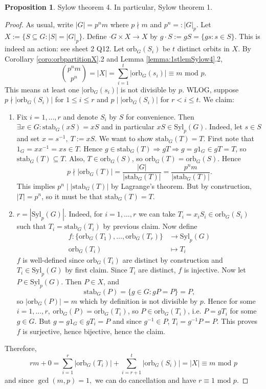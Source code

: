 \documentclass[a4paper]{article}
\newcommand{\Syl}{\text{Syl}}
\newcommand{\orb}{\text{orb}}
\newcommand{\stab}{\text{stab}}
\newcommand{\Mod}{\text{ mod }}
\theoremstyle{definition}
\newtheorem{prop}[defn]{Proposition}
\begin{document}
\begin{prop}
Sylow theorem 4. In particular, Sylow theorem 1.
\end{prop}
\begin{proof}
As usual, write $|G|=p^n m$ where $p\nmid m$ and $p^n=:|G|_p$. Let $X:=\{S\subseteq G:|S|=|G|_p\}$. Define $\cdot G\times X\rightarrow X$ by $g\cdot S:=gS=\{gs:s\in S\}$. This is indeed an action: see sheet 2 Q12. Let $\orb_G(S_i)$ be $t$ distinct orbits in $X$. By Corollary \ref{coro:orbpartitionX}.2 and Lemma \ref{lemma:1stlemSylow4}.2,
\[
\binom{p^n m}{p^n}=|X|=\sum_{i=1}^t |\orb_G(s_i)| \equiv m\Mod p.
\]
This means at least one $|\orb_G(s_i)|$ is not divisible by $p$. WLOG, suppose $p\nmid |\orb_G(S_i)|$ for $1\leq i\leq r$ and $p\mid |\orb_G(S_i)|$ for $r< i\leq t$. We claim:
\begin{enumerate}
\item Fix $i=1,\ldots,r$ and denote $S_i$ by $S$ for convenience. Then $\exists x\in G:\stab_G(xS)=xS$ and in particular $xS\in\Syl_p(G)$. Indeed, let $s\in S$ and set $x=s^{-1},\ T:=xS$. We want to show $\stab_G(T)=T$. First note that $1_G=xx^{-1}=xs\in T$. Hence $g\in\stab_G(T)\Rightarrow gT\Rightarrow g=g1_G\in gT=T$, so $\stab_G(T)\subseteq T$. Also, $T\in\orb_G(S)$, so $\orb_G(T)=\orb_G(S)$. Hence
\[
p\nmid |\orb_G(T)|=\frac{|G|}{|\stab_G(T)|}=\frac{p^n m}{|\stab_G(T)|}.
\]
This implies $p^n\mid |\stab_G(T)|$ by Lagrange's theorem. But by construction, $|T|=p^n$, so it must be that $\stab_G(T)=T$.
\item $r=|\Syl_p(G)|$. Indeed, for $i=1,\ldots,r$ we can take $T_i=x_i S_i\in\orb_G(S_i)$ such that $T_i=\stab_G(T_i)$ by previous claim. Now define
\[
\begin{aligned}
f:\{\orb_G(T_1),\ldots,\orb_G(T_r)\} &\rightarrow \Syl_p(G) \\
\orb_G(T_i) &\mapsto T_i
\end{aligned}
\]
$f$ is well-defined since $\orb_G(T_i)$ are distinct by construction and $T_i\in\Syl_p(G)$ by first claim. Since $T_i$ are distinct, $f$ is injective. Now let $P\in\Syl_p(G)$. Then $P\in X$, and
\[
\stab_G(P)=\{g\in G:gP=P\}=P,
\]
so $|\orb_G(P)|=m$ which by definition is not divisible by $p$. Hence for some $i=1,\ldots,r,\ \orb_G(P)=\orb_G(T_i)$, so $P\in\orb_G(T_i)$, i.e. $P=gT_i$ for some $g\in G$. But $g=g1_G\in gT_i=P$ and since $g^{-1}\in P$, $T_i=g^{-1}P=P$. This proves $f$ is surjective, hence bijective, hence the claim.
\end{enumerate}
Therefore,
\[
rm+0=\sum_{i=1}^r |\orb_G(T_i)|+\sum_{i=r+1}^t |\orb_G(S_i)|=|X|\equiv m\Mod p
\]
and since $\gcd(m,p)=1,$ we can do cancellation and have $r\equiv 1\Mod p$.
\end{proof}
\end{document}
